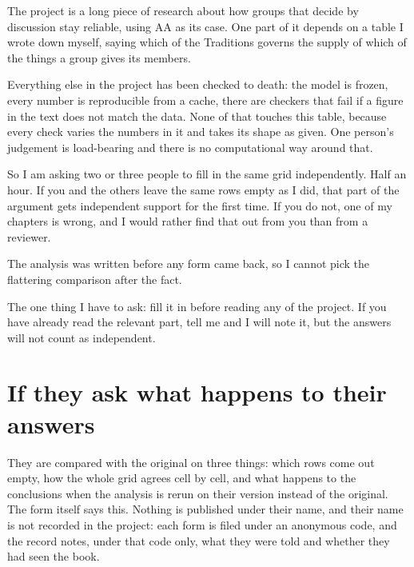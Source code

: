 \documentclass[11pt]{article}
\begin{document}
\begin{note}
The project is a long piece of research about how groups that decide by discussion stay reliable,
using AA as its case. One part of it depends on a table I wrote down myself, saying which of the
Traditions governs the supply of which of the things a group gives its members.

\medskip
Everything else in the project has been checked to death: the model is frozen, every number is
reproducible from a cache, there are checkers that fail if a figure in the text does not match the
data. None of that touches this table, because every check varies the numbers in it and takes its
shape as given. One person's judgement is load-bearing and there is no computational way around
that.

\medskip
So I am asking two or three people to fill in the same grid independently. Half an hour. If you
and the others leave the same rows empty as I did, that part of the argument gets independent
support for the first time. If you do not, one of my chapters is wrong, and I would rather find
that out from you than from a reviewer.

\medskip
The analysis was written before any form came back, so I cannot pick the flattering comparison
after the fact.

\medskip
The one thing I have to ask: fill it in before reading any of the project. If you have already
read the relevant part, tell me and I will note it, but the answers will not count as independent.
\end{note}

\section{If they ask what happens to their answers}

They are compared with the original on three things: which rows come out empty, how the whole grid
agrees cell by cell, and what happens to the conclusions when the analysis is rerun on their
version instead of the original. The form itself says this. Nothing is published under their name,
and their name is not recorded in the project: each form is filed under an anonymous code, and the
record notes, under that code only, what they were told and whether they had seen the book.
\end{document}
